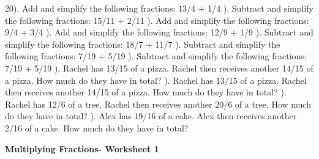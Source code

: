 \documentclass{article}%
\begin{document}
20). Add and simplify the following fractions: 13/4 + 1/4%
\newline%
\newline%
). Subtract and simplify the following fractions: 15/11 + 2/11%
\newline%
\newline%
). Add and simplify the following fractions: 9/4 + 3/4%
\newline%
\newline%
). Add and simplify the following fractions: 12/9 + 1/9%
\newline%
\newline%
). Subtract and simplify the following fractions: 18/7 + 11/7%
\newline%
\newline%
). Subtract and simplify the following fractions: 7/19 + 5/19%
\newline%
\newline%
). Subtract and simplify the following fractions: 7/19 + 5/19%
\newline%
\newline%
). Rachel has 13/15 of a pizza. Rachel then receives another 14/15 of a pizza. How much do they have in total?%
\newline%
\newline%
). Rachel has 13/15 of a pizza. Rachel then receives another 14/15 of a pizza. How much do they have in total?%
\newline%
\newline%
). Rachel has 12/6 of a tree. Rachel then receives another 20/6 of a tree. How much do they have in total?%
\newline%
\newline%
). Alex has 19/16 of a cake. Alex then receives another 2/16 of a cake. How much do they have in total?%
\newline%
\newline%
\newline%
\pagebreak%
\large%
\begin{center}%
\textbf{Multiplying Fractions- Worksheet 1}%
\newline%
\end{center} \normalsize%
\end{document}

